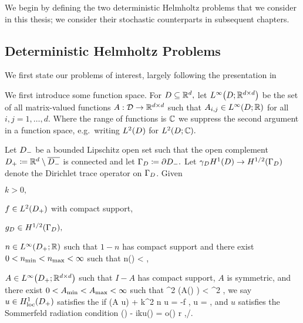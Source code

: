   We  begin by defining the two deterministic Helmholtz problems that we consider in this thesis; we  consider their stochastic counterparts in subsequent chapters.

\subsection{Deterministic Helmholtz Problems}\label{sec:detprobs}

We first state our problems of interest, largely following the presentation in \cite{GrPeSp:19}

We first introduce some function space. For $D \subseteq \mathbb R^{d},$ let $\LiDRRdtd$ be the set of all matrix-valued functions $A:\mathcal D\rightarrow\mathbb R^{d\times d}$ such that $A_{i,j} \in \LiDRR$ for all $i,j =   1,\ldots,d.$ Where the range of functions is $\mathbb C$ we suppress the second argument in a function space, e.g.~writing $\LtD$ for $\LtDCC.$

  \label{prob:edp}
  Let $D_{-}$ be a bounded Lipschitz open set such that the open complement $D_{+} \coloneqq \mathbb R^{d} \setminus \overline{D_{-}}$ is connected and let $\Gamma_{D} \coloneqq \partial D_{-}.$ Let $\trD\HoD\rightarrow\HhGD$ denote the Dirichlet trace operator on $\Gamma_{D}$. Given
  \bit
  \item $k > 0,$
\item $f \in \LtDp$ with compact support,
\item $\gD \in \HhGD,$
\item $n \in \LiDpRR$ such that $1-n$ has compact support and there exist $0 < n_{\min} < n_{\max} < \infty$ such that
  \beq\label{eq:nbounds}
\nmin \leq n(\bx) < \nmax \tfae \bx \in \Dp,
  \eeq
\item $A \in \LiDpRRdtd$ such that $I-A$ has compact support, $A$ is symmetric, and there exist $0 < A_{\min} < A_{\max} < \infty$ such that
  \beq\label{eq:Abounds}
\Amin \abs{\bxi}^2 \leq \mleft(A(\bx) \bxi \mright) \cdot \bxibar < \Amax \abs{\bxi}^2 \tfa \bxi \in \CCd \tfae \bx \in \Dp,
  \eeq
  \eit
  we say $u \in \HolocDp$ satisfies the  if
  \beq\label{eq:hhedp}
\grad \cdot \mleft(A \grad u\mright) + k^2 n u = -f \tin \Dp,
\eeq
\beq\label{eq:dbc}
\trGD u = \gD,
\eeq
and $u$ satisfies the Sommerfeld radiation condition
\beq\label{eq:sommerfeld}
\dudr(\bx) - iku(\bx) = o\mleft(\mright) r \de \abs{\bx} \rightarrow \infty,\bxhat \de \bx/\abs{\bx}.
\eeq
\eprob

